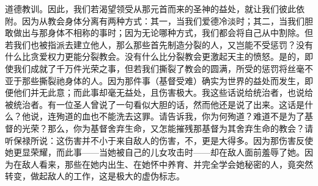 道德教训。因此，我们若渴望领受从那元首而来的圣神的益处，就让我们彼此依附。因为从教会身体分离有两种方式：其一，当我们爱德冷淡时；其二，当我们胆敢做出与那身体不相称的事时；因为无论哪种方式，我们都会将自己从中割除。但若我们也被指派去建立他人，那么那些首先制造分裂的人，又岂能不受惩罚？没有什么比贪爱权力更能分裂教会。没有什么比分裂教会更激起天主的愤怒。是的，即使我们成就了千万件光荣之事，但若我们撕裂了教会的圆满，所受的惩罚将丝毫不亚于那些撕裂祂身体的人。因为那件事（基督受难）确实为世界的益处而发生，即便他们并无此意；而此事却毫无益处，且伤害极大。我这些话说给统治者，也说给被统治者。有一位圣人曾说了一句看似大胆的话，然而他还是说了出来。这话是什么？他说，连殉道的血也不能洗去这罪。请告诉我，你为何殉道？难道不是为了基督的光荣？那么，你为基督舍弃生命，又怎能摧残那基督为其舍弃生命的教会？请听保禄所说：这伤害并不小于来自敌人的伤害，不，更是大得多。因为那伤害反使她更显荣耀，而此事——当她被自己的儿女攻击时——却在敌人面前羞辱了她。因为在敌人看来，那些在她内出生、在她怀中养育、并完全学会她秘密的人，竟突然转变，做起敌人的工作，这是极大的虚伪标志。\par

